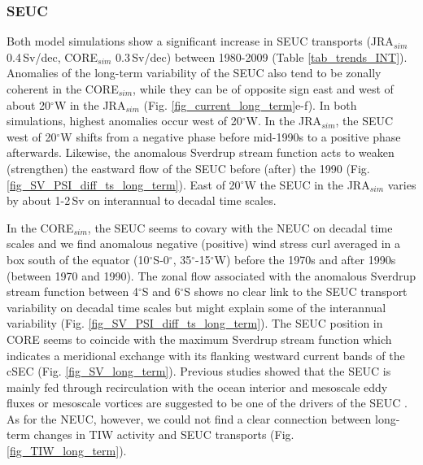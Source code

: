 \documentclass[os, manuscript]{copernicus}
\begin{document}
	
	\subsubsection{SEUC}
	Both model simulations show a significant increase in SEUC transports (JRA$_{sim}$ 0.4$\,$Sv/dec, CORE$_{sim}$ 0.3$\,$Sv/dec) between 1980-2009 (Table \ref{tab_trends_INT}). Anomalies of the long-term variability of the SEUC also tend to be zonally coherent in the CORE$_{sim}$, while they can be of opposite sign east and west of about 20$^{\circ}$W in the JRA$_{sim}$ (Fig. \ref{fig_current_long_term}e-f). In both simulations, highest anomalies occur west of 20$^{\circ}$W. In the JRA$_{sim}$, the SEUC west of 20$^{\circ}$W shifts from a negative phase before mid-1990s to a positive phase afterwards. Likewise, the anomalous Sverdrup stream function acts to weaken (strengthen) the eastward flow of the SEUC before (after) the 1990 (Fig. \ref{fig_SV_PSI_diff_ts_long_term}). East of 20$^{\circ}$W the SEUC in the JRA$_{sim}$ varies by about 1-2$ \, $Sv on interannual to decadal time scales. 
	
	In the CORE$_{sim}$, the SEUC seems to covary with the NEUC on decadal time scales and we find anomalous negative (positive) wind stress curl averaged in a box south of the equator (10$^{\circ}$S-0$^{\circ}$, 35$^{\circ}$-15$^{\circ}$W) before the 1970s and after 1990s (between 1970 and 1990). The zonal flow associated with the anomalous Sverdrup stream function between 4$^{\circ}$S and 6$^{\circ}$S shows no clear link to the SEUC transport variability on decadal time scales but might explain some of the interannual variability (Fig. \ref{fig_SV_PSI_diff_ts_long_term}). The SEUC position in CORE seems to coincide with the maximum Sverdrup stream function which indicates a meridional exchange with its flanking westward current bands of the cSEC (Fig. \ref{fig_SV_long_term}). Previous studies showed that the SEUC is mainly fed through recirculation with the ocean interior \citep{Huettl2008,Fischer2008} and mesoscale eddy fluxes or mesoscale vortices are suggested to be one of the drivers of the SEUC \citep{Jochum2004b,Assene2020}. As for the NEUC, however, we could not find a clear connection between long-term changes in TIW activity and SEUC transports (Fig. \ref{fig_TIW_long_term}).
	
\end{document}
